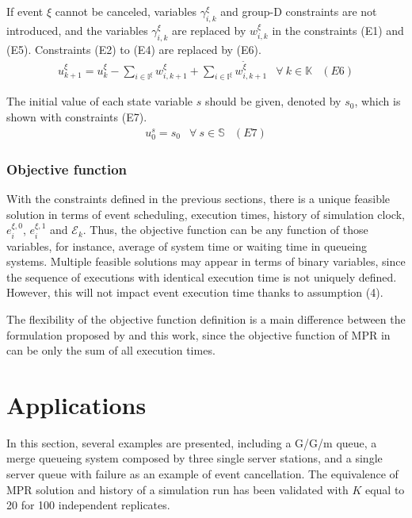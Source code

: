 \documentclass[]{interact}
\theoremstyle{plain}%
\theoremstyle{definition}
\theoremstyle{remark}
\begin{document}
 If event ${\xi}$ cannot be canceled, variables $\gamma^{\xi}_{i,k}$ and group-D constraints are not introduced, and the variables $\gamma^{\xi}_{i,k}$ are replaced by $w^{\xi}_{i,k}$ in the constraints (E1) and (E5). Constraints (E2) to (E4) are replaced by (E6).
 \begin{eqnarray}
 u^{\xi}_{k+1}= u^{\xi}_{k} - \sum_{i\in \mathbb{I}^{\xi}} w^{\xi}_{i,k+1} + \sum_{i\in \mathbb{I}^{\xi}} w^{\tilde{\xi}}_{i,k+1} & \forall\ k\in \mathbb{K}&(E6)\nonumber
 \end{eqnarray}
 
The initial value of each state variable $s$ should be given, denoted by $s_{0}$, which is shown with constraints (E7).
\begin{eqnarray}
u^{s}_{0} =  s_0& \forall\ s\in \mathbb{S}&(E7)\nonumber
\end{eqnarray}

 
\subsubsection{Objective function}\label{sec:obj}
With the constraints defined in the previous sections, there is a unique feasible solution in terms of event scheduling, execution times, history of simulation clock, $e^{\xi,0}_i$, $e^{\xi,1}_{i}$ and $\mathcal{E}_k$. Thus, the objective function can be any function of those variables, for instance, average of system time or waiting time in queueing systems. Multiple feasible solutions may appear in terms of binary variables, since the sequence of executions with identical execution time is not uniquely defined. However, this will not impact event execution time thanks to assumption (4).

The flexibility of the objective function definition is a main difference between the formulation proposed by \cite{chan2008optimization} and this work, since the objective function of MPR in \cite{chan2008optimization} can be only the sum of all execution times.


\section{Applications}\label{sec:app}

In this section, several examples are presented, including a G/G/m queue, a merge queueing system composed by three single server stations, and a single server queue with failure as an example of event cancellation. The equivalence of MPR solution and history of a simulation run has been validated with $K$ equal to 20 for 100 independent replicates. 
\end{document}
